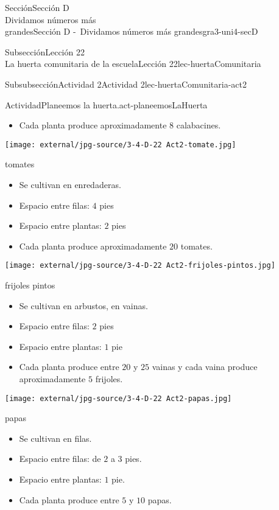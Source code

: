 \begin{sectionptx}{Sección}{{\Large Sección D\\}Dividamos números más\\grandes}{}{Sección D -~Dividamos números más grandes}{}{}{gra3-uni4-secD}
\begin{subsectionptx}{Subsección}{{\normalsize Lección 22\\[-0.05cm]}La huerta comunitaria de la escuela}{}{Lección 22}{}{}{lec-huertaComunitaria}
\begin{subsubsectionptx}{Subsubsección}{Actividad 2}{}{Actividad 2}{}{}{lec-huertaComunitaria-act2}
\begin{activity}{Actividad}{Planeemos la huerta.}{act-planeemosLaHuerta}
\begin{sidebyside}{2}{0.025}{0.025}{0.05}
\begin{sbspanel}{0.45}
\begin{itemize}[label=\textbullet]
\item{}Cada planta produce aproximadamente \(8\) calabacines.%
\end{itemize}
\end{sbspanel}%
\begin{sbspanel}{0.45}%
\texttt{[image: external/jpg-source/3-4-D-22 Act2-tomate.jpg]}
%
\par
tomates%
%
\begin{itemize}[label=\textbullet]
\item{}Se cultivan en enredaderas.%
\item{}Espacio entre filas: \(4\) pies%
\item{}Espacio entre plantas: \(2\) pies%
\item{}Cada planta produce aproximadamente \(20\) tomates.%
\end{itemize}
\end{sbspanel}%
\end{sidebyside}%
\begin{sidebyside}{2}{0.025}{0.025}{0.05}%
\begin{sbspanel}{0.45}%
\texttt{[image: external/jpg-source/3-4-D-22 Act2-frijoles-pintos.jpg]}
%
\par
frijoles pintos%
%
\begin{itemize}[label=\textbullet]
\item{}Se cultivan en arbustos, en vainas.%
\item{}Espacio entre filas: \(2\) pies%
\item{}Espacio entre plantas: \(1\) pie%
\item{}Cada planta produce entre \(20\) y \(25\) vainas y cada vaina produce aproximadamente \(5\) frijoles.%
\end{itemize}
\end{sbspanel}%
\begin{sbspanel}{0.45}%
\texttt{[image: external/jpg-source/3-4-D-22 Act2-papas.jpg]}
%
\par
papas%
%
\begin{itemize}[label=\textbullet]
\item{}Se cultivan en filas.%
\item{}Espacio entre filas: de \(2\) a \(3\) pies.%
\item{}Espacio entre plantas: \(1\) pie.%
\item{}Cada planta produce entre \(5\) y \(10\) papas.%
\end{itemize}
\end{sbspanel}%

\end{sidebyside}
\end{activity}
\end{subsubsectionptx}
\end{subsectionptx}
\end{sectionptx}

